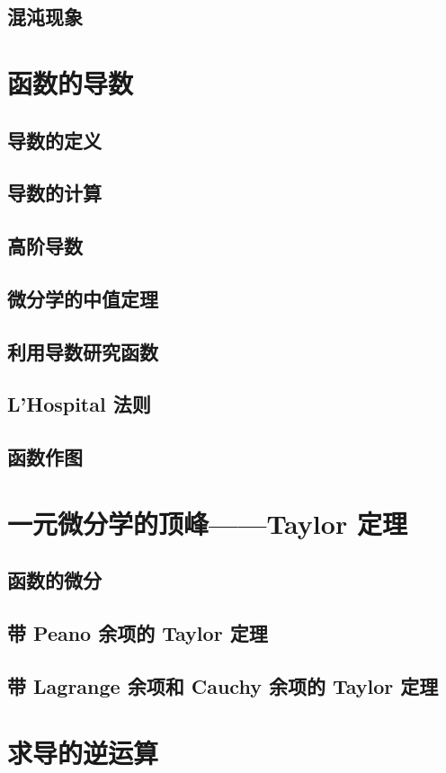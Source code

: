 \documentclass[a4paper, 12pt]{ctexbook}
\begin{document}
        \section{混沌现象}
    \chapter{函数的导数}
        \section{导数的定义}
        \section{导数的计算}
        \section{高阶导数}
        \section{微分学的中值定理}
        \section{利用导数研究函数}
        \section{L'Hospital 法则}
        \section{函数作图}
    \chapter{一元微分学的顶峰——Taylor 定理}
        \section{函数的微分}
        \section{带 Peano 余项的 Taylor 定理}
        \section{带 Lagrange 余项和 Cauchy 余项的 Taylor 定理}
    \chapter{求导的逆运算}
\end{document}
